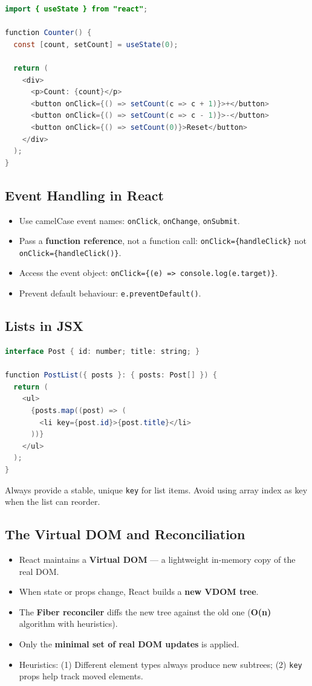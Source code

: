 \documentclass[hidelinks]{article}
\begin{document}
\begin{lstlisting}[language=Java, caption={useState example --- counter}]
import { useState } from "react";

function Counter() {
  const [count, setCount] = useState(0);

  return (
    <div>
      <p>Count: {count}</p>
      <button onClick={() => setCount(c => c + 1)}>+</button>
      <button onClick={() => setCount(c => c - 1)}>-</button>
      <button onClick={() => setCount(0)}>Reset</button>
    </div>
  );
}
\end{lstlisting}

\subsection{Event Handling in React}
\begin{itemize}
  \item Use camelCase event names: \texttt{onClick}, \texttt{onChange}, \texttt{onSubmit}.
  \item Pass a \textbf{function reference}, not a function call: \texttt{onClick=\{handleClick\}} not \texttt{onClick=\{handleClick()\}}.
  \item Access the event object: \texttt{onClick=\{(e) => console.log(e.target)\}}.
  \item Prevent default behaviour: \texttt{e.preventDefault()}.
\end{itemize}

\subsection{Lists in JSX}
\begin{lstlisting}[language=Java, caption={Rendering a list with keys}]
interface Post { id: number; title: string; }

function PostList({ posts }: { posts: Post[] }) {
  return (
    <ul>
      {posts.map((post) => (
        <li key={post.id}>{post.title}</li>
      ))}
    </ul>
  );
}
\end{lstlisting}
Always provide a stable, unique \texttt{key} for list items. Avoid using array index as key when the list can reorder.

\subsection{The Virtual DOM and Reconciliation}
\begin{itemize}
  \item React maintains a \textbf{Virtual DOM} --- a lightweight in-memory copy of the real DOM.
  \item When state or props change, React builds a \textbf{new VDOM tree}.
  \item The \textbf{Fiber reconciler} diffs the new tree against the old one (\textbf{O(n)} algorithm with heuristics).
  \item Only the \textbf{minimal set of real DOM updates} is applied.
  \item Heuristics: (1) Different element types always produce new subtrees; (2) \texttt{key} props help track moved elements.
\end{itemize}
\end{document}
